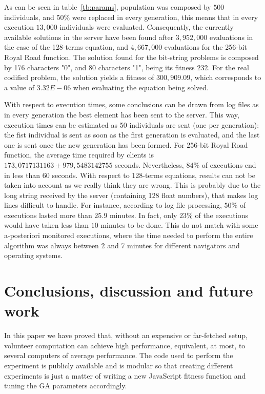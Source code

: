 \documentclass[runningheads,a4paper]{llncs}
\begin{document}
As can be seen in table~\ref{tb:params}, population was composed by $500$ individuals, and $50\%$ were replaced in every generation, this means that in every execution $13,000$ individuals were evaluated. Consequently, the currently available solutions in the server have been found after $3,952,000$ evaluations in the case of the 128-terms equation, and $4,667,000$ evaluations for the 256-bit Royal Road function. The solution found for the bit-string problems is composed by 176 characters "0", and 80 characters "1", being  its fitness 232. For the real codified problem, the solution yields a fitness of $300,909.09$, which corresponds to a value of $3.32E-06$ when evaluating the equation being solved.

With respect to execution times, some conclusions can be drawn from log files as in every generation the best element has been sent to the server. This way, execution times can be estimated as 50 individuals are sent (one per generation): the fist individual is sent as soon as the first generation is evaluated, and the last one is sent once the new generation has been formed. For 256-bit Royal Road function, the average time required by clients is $173,0717131163\pm979,5483142755$ seconds. Nevertheless, $84\%$ of executions end in less than $60$ seconds. With respect to 128-terms equations, results can not be taken into account as we really think they are wrong. This is probably due to the long string received by the server (containing 128 float numbers), that makes log lines difficult to handle. For instance, according to log file processing, $50\%$ of executions lasted more than $25.9$ minutes. In fact, only $23\%$ of the executions would have taken less than $10$ minutes to be done. This do not match with  some a-posteriori monitored executions, where the time needed to perform the entire algorithm was always between 2 and 7 minutes for different navigators and operating systems.



\section{Conclusions, discussion and future work}
\label{sec:conc}

In this paper we have proved that, 
without an expensive or far-fetched setup, volunteer computation can achieve high
performance, equivalent, at most, to several computers of average
performance. The code used to perform the experiment is publicly
available and is modular so that creating different experiments is
just a matter of writing a new JavaScript fitness function and tuning
the GA parameters accordingly. 
\end{document}
